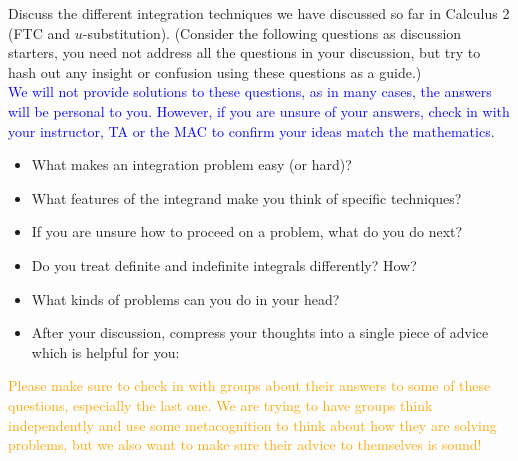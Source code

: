\documentclass{ximera}
\begin{document}
\begin{exercise}
    Discuss the different integration techniques we have discussed so far in Calculus 2 (FTC and $u$-substitution). (Consider the following questions as discussion starters, you need not address all the questions in your discussion, but try to hash out any insight or confusion using these questions as a guide.)\\
    \textcolor{blue}{We will not provide solutions to these questions, as in many cases, the answers will be personal to you.  However, if you are unsure of your answers, check in with your instructor, TA or the MAC to confirm your ideas match the mathematics.}

    \begin{itemize}
        \item What makes an integration problem easy (or hard)?

        \item What features of the integrand make you think of specific techniques?

        \item If you are unsure how to proceed on a problem, what do you do next?

        \item Do you treat definite and indefinite integrals differently? How?

        \item What kinds of problems can you do in your head?
        
        \item After your discussion, compress your thoughts into a single piece of advice which is helpful for you:
    \end{itemize}
    \textcolor{orange}{Please make sure to check in with groups about their answers to some of these questions, especially the last one.  We are trying to have groups think independently and use some metacognition to think about how they are solving problems, but we also want to make sure their advice to themselves is sound! }
\end{exercise}
\end{document}
